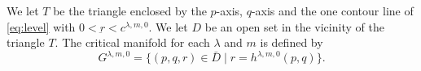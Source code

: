 \documentclass[a4paper,11pt]{article}
\begin{document}
We let $T$ be the triangle enclosed by the $p$-axis, $q$-axis and the one contour line of \eqref{eq:level} with $0<\underbar{r} < c^{\lambda,m,0}$. We let $D$ be an open set in the vicinity of the triangle $T$. The critical manifold for each $\lambda$ and $m$ is defined by
\begin{equation}
 G^{\lambda,m,0} = \{(p,q,r) \in \bar{D} \;|\; r=h^{\lambda,m,0}(p,q)\}.
\end{equation}




%
%
%
\end{document}

